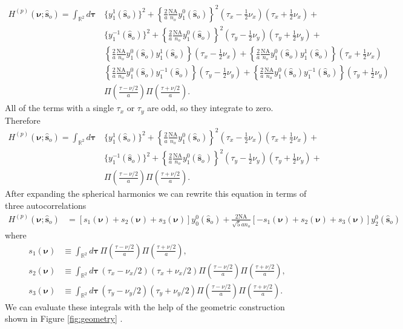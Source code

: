 \documentclass[11pt]{article}
\providecommand{\so}[1]{\mathbf{\hat{s}}_o}
\providecommand{\bs}[1]{\boldsymbol{#1}}
\begin{document}
\begin{align}
    H^{(p)}(\bs{\nu}; \so{}) = \int_{\mathbb{R}^2}d\bs{\tau}\, &
      \{y_1^1(\so{})\}^2  + \left\{\frac{2}{a}\frac{\text{NA}}{n_o}y_1^0(\so{})\right\}^2(\tau_x - \frac{1}{2}\nu_x)(\tau_x + \frac{1}{2}\nu_x) + \nonumber \\
                                                                 &\{y_1^{-1}(\so{})\}^2 + \left\{\frac{2}{a}\frac{\text{NA}}{n_o}y_1^0(\so{})\right\}^2(\tau_y - \frac{1}{2}\nu_y)(\tau_y + \frac{1}{2}\nu_y) + \nonumber \\
                                                                 &\left\{\frac{2}{a}\frac{\text{NA}}{n_o}y_1^0(\so{})y_1^1(\so{})\right\}(\tau_x - \frac{1}{2}\nu_x) + \left\{\frac{2}{a}\frac{\text{NA}}{n_o}y_1^0(\so{})y_1^1(\so{})\right\}(\tau_x + \frac{1}{2}\nu_x) \nonumber \\
  &\left\{\frac{2}{a}\frac{\text{NA}}{n_o}y_1^0(\so{})y_1^{-1}(\so{})\right\}(\tau_y - \frac{1}{2}\nu_y) + \left\{\frac{2}{a}\frac{\text{NA}}{n_o}y_1^0(\so{})y_1^{-1}(\so{})\right\}(\tau_y + \frac{1}{2}\nu_y) \nonumber \\  
&\Pi\left(\frac{\tau - \nu/2}{a}\right)\Pi\left(\frac{\tau + \nu/2}{a}\right). 
\end{align}
All of the terms with a single $\tau_x$ or $\tau_y$ are odd, so they integrate
to zero. Therefore
\begin{align}
    H^{(p)}(\bs{\nu}; \so{}) = \int_{\mathbb{R}^2}d\bs{\tau}\, &
      \{y_1^1(\so{})\}^2  + \left\{\frac{2}{a}\frac{\text{NA}}{n_o}y_1^0(\so{})\right\}^2(\tau_x - \frac{1}{2}\nu_x)(\tau_x + \frac{1}{2}\nu_x) + \nonumber \\
                                                                 &\{y_1^{-1}(\so{})\}^2 + \left\{\frac{2}{a}\frac{\text{NA}}{n_o}y_1^0(\so{})\right\}^2(\tau_y - \frac{1}{2}\nu_y)(\tau_y + \frac{1}{2}\nu_y) + \nonumber \\
&\Pi\left(\frac{\tau - \nu/2}{a}\right)\Pi\left(\frac{\tau + \nu/2}{a}\right). 
\end{align}
After expanding the spherical harmonics we can rewrite this equation in terms of
three autocorrelations
\begin{align}
    H^{(p)}(\bs{\nu}; \so{}) &= [s_1(\bs{\nu}) + s_2(\bs{\nu}) + s_3(\bs{\nu})]y_0^0(\so{}) + \frac{2\text{NA}}{\sqrt{5}a n_o}[-s_1(\bs{\nu}) + s_2(\bs{\nu}) + s_3(\bs{\nu})]y_2^0(\so{})\label{eq:hinter}
\end{align}
where
\begin{align}
  s_1(\bs{\nu}) &\equiv \int_{\mathbb{R}^2}d\bs{\tau}\, \Pi\left(\frac{\tau - \nu/2}{a}\right)\Pi\left(\frac{\tau + \nu/2}{a}\right),\\
  s_2(\bs{\nu}) &\equiv \int_{\mathbb{R}^2}d\bs{\tau}\, (\tau_x - \nu_x/2)(\tau_x + \nu_x/2) \Pi\left(\frac{\tau - \nu/2}{a}\right)\Pi\left(\frac{\tau + \nu/2}{a}\right),\\
  s_3(\bs{\nu}) &\equiv \int_{\mathbb{R}^2}d\bs{\tau}\, (\tau_y - \nu_y/2)(\tau_y + \nu_y/2) \Pi\left(\frac{\tau - \nu/2}{a}\right)\Pi\left(\frac{\tau + \nu/2}{a}\right).
\end{align}
We can evaluate these integrals with the help of the geometric construction
shown in Figure \ref{fig:geometry} \cite{goodman1996}. 
\end{document}
